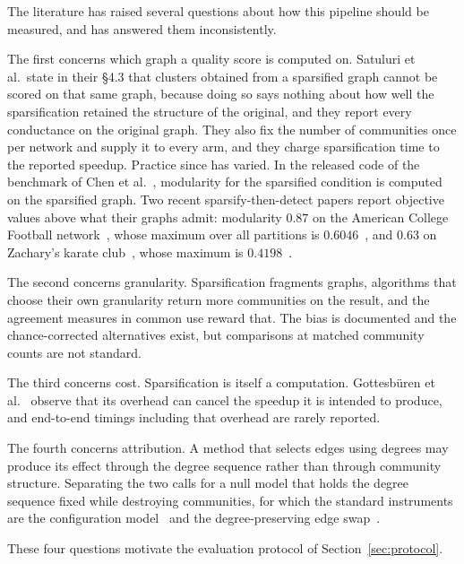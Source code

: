The literature has raised several questions about how this pipeline should be
measured, and has answered them inconsistently.

The first concerns which graph a quality score is computed on. Satuluri et
al.\ state in their \S4.3 that clusters obtained from a sparsified graph cannot
be scored on that same graph, because doing so says nothing about how well the
sparsification retained the structure of the original, and they report every
conductance on the original graph. They also fix the number of communities once
per network and supply it to every arm, and they charge sparsification time to
the reported speedup. Practice since has varied. In the released code of the
benchmark of Chen et al.~\cite{chen2024demystifying}, modularity for the
sparsified condition is computed on the sparsified graph. Two recent
sparsify-then-detect papers report objective values above what their graphs
admit: modularity $0.87$ on the American College Football
network~\cite{girvan2002community}, whose maximum over all partitions is
$0.6046$~\cite{pari2026effective}, and $0.63$ on Zachary's karate
club~\cite{zachary1977information}, whose maximum is
$0.4198$~\cite{setiadi2025community}.

The second concerns granularity. Sparsification fragments graphs, algorithms that
choose their own granularity return more communities on the result, and the
agreement measures in common use reward that. The bias is documented and the
chance-corrected alternatives exist, but comparisons at matched community counts
are not standard.

The third concerns cost. Sparsification is itself a computation.
Gottesb\"{u}ren et al.~\cite{gottesburen2025linear} observe that its overhead can
cancel the speedup it is intended to produce, and end-to-end timings including
that overhead are rarely reported.

The fourth concerns attribution. A method that selects edges using degrees may
produce its effect through the degree sequence rather than through community
structure. Separating the two calls for a null model that holds the degree
sequence fixed while destroying communities, for which the standard instruments
are the configuration model~\cite{molloy1995critical} and the degree-preserving
edge swap~\cite{maslov2002specificity}.

These four questions motivate the evaluation protocol of
Section~\ref{sec:protocol}.
